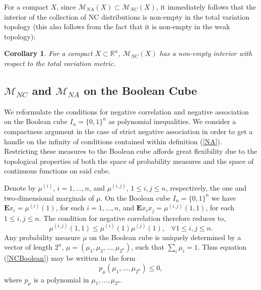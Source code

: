\documentclass[11pt]{article}
\newcommand{\E}{\mathbf{E}}
\newcommand{\R}{\mathbb{R}}
\newcommand{\m}{\mathcal{M}}
\newtheorem{cor}{Corollary}
\begin{document}
For a compact $X$, since $\m_{NA}(X) \subset \m_{NC}(X)$, it immediately follows that the interior of the collection of NC distributions is non-empty in the total variation topology (this also follows from the fact that it is non-empty in the weak topology):
\begin{cor}
For a compact $X\subset \R^n$,
$\m_{NC}(X)$ has a non-empty interior with respect to the total variation metric.
\end{cor}


\subsection{$\m_{NC}$ and $\m_{NA}$ on the Boolean Cube}\label{sec_interior}


We reformulate the conditions for negative correlation and negative association on the Boolean cube $I_n=\{0,1\}^n$ as polynomial inequalities. We consider a compactness argument in the case of strict negative association in order to get a handle on the infinity of conditions contained within  definition (\ref{NA}). Restricting these measures to the Boolean cube affords great flexibility due to the topological properties of both the space of probability measures and the space of continuous functions on said cube.


Denote by $\mu^{(i)}$, $i=1,\dots,n$,
and $\mu^{(i,j)}$, $1\leq i,j\leq n$,
respectively, the one and two-dimensional marginals of $\mu$. 
On the Boolean cube $I_n=\{0,1\}^n$ we have $\E x_i =\mu^{(i)}(1)$, for each $i=1,\dots, n$, and $\E x_ix_j = \mu^{(i,j)}(1,1)$, for each $1\leq i,j\leq n$. The condition for negative correlation therefore reduces to,
\begin{equation}\label{NCBoolean}
\mu^{(i,j)}(1,1)\leq \mu^{(i)}(1)\mu^{(j)}(1), \;\;\; \forall 1\leq i,j\leq n.
\end{equation}
Any probability measure $\mu$ on the Boolean cube is uniquely determined
by a vector of length $2^n$, $\mu = (\mu_1,\mu_2,\dots, \mu_{2^n})$, 
such that $\sum_i \mu_i =1$. Thus equation (\ref{NCBoolean}) 
may be written in the form 
\begin{equation}\label{NCPolynomial}
p_{\mu}(\mu_1,\dots,\mu_{2^n}) \leq 0,
\end{equation}
where $p_{\mu}$ is a polynomial in $\mu_1,\dots,\mu_{2^n}$.
\end{document}

